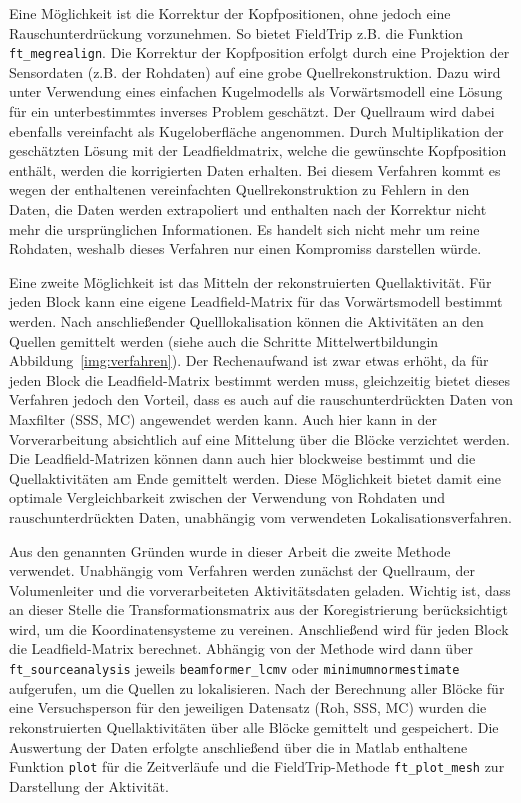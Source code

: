 \documentclass[doc,a4paper,12pt]{apa6}
\begin{document}
Eine Möglichkeit ist die Korrektur der Kopfpositionen, ohne jedoch eine Rauschunterdrückung vorzunehmen. So bietet FieldTrip z.B. die Funktion \texttt{ft\_megrealign}. Die Korrektur der Kopfposition erfolgt durch eine Projektion der Sensordaten (z.B. der Rohdaten) auf eine grobe Quellrekonstruktion. Dazu wird unter Verwendung eines einfachen Kugelmodells als Vorwärtsmodell eine Lösung für ein unterbestimmtes inverses Problem geschätzt. Der Quellraum wird dabei ebenfalls vereinfacht als Kugeloberfläche angenommen. Durch Multiplikation der geschätzten Lösung mit der Leadfieldmatrix, welche die gewünschte Kopfposition enthält, werden die korrigierten Daten erhalten. Bei diesem Verfahren kommt es wegen der enthaltenen vereinfachten Quellrekonstruktion zu Fehlern in den Daten, die Daten werden extrapoliert und enthalten nach der Korrektur nicht mehr die ursprünglichen Informationen. Es handelt sich nicht mehr um reine Rohdaten, weshalb dieses Verfahren nur einen Kompromiss darstellen würde.

Eine zweite Möglichkeit ist das Mitteln der rekonstruierten Quellaktivität. Für jeden Block kann eine eigene Leadfield-Matrix für das Vorwärtsmodell bestimmt werden. Nach anschließender Quelllokalisation können die Aktivitäten an den Quellen gemittelt werden (siehe auch die Schritte \glqq Mittelwertbildung\grqq in Abbildung~\ref{img:verfahren}). Der Rechenaufwand ist zwar etwas erhöht, da für jeden Block die Leadfield-Matrix bestimmt werden muss, gleichzeitig bietet dieses Verfahren jedoch den Vorteil, dass es auch auf die rauschunterdrückten Daten von Maxfilter (SSS, MC) angewendet werden kann. Auch hier kann in der Vorverarbeitung absichtlich auf eine Mittelung über die Blöcke verzichtet werden. Die Leadfield-Matrizen können dann auch hier blockweise bestimmt und die Quellaktivitäten am Ende gemittelt werden. Diese Möglichkeit bietet damit eine optimale Vergleichbarkeit zwischen der Verwendung von Rohdaten und rauschunterdrückten Daten, unabhängig vom verwendeten Lokalisationsverfahren.

Aus den genannten Gründen wurde in dieser Arbeit die zweite Methode verwendet. Unabhängig vom Verfahren werden zunächst der Quellraum, der Volumenleiter und die vorverarbeiteten Aktivitätsdaten geladen. Wichtig ist, dass an dieser Stelle die Transformationsmatrix aus der Koregistrierung berücksichtigt wird, um die Koordinatensysteme zu vereinen. Anschließend wird für jeden Block die Leadfield-Matrix berechnet. Abhängig von der Methode wird dann über \texttt{ft\_sourceanalysis} jeweils \texttt{beamformer\_lcmv} oder \texttt{minimumnormestimate} aufgerufen, um die Quellen zu lokalisieren. Nach der Berechnung aller Blöcke für eine Versuchsperson für den jeweiligen Datensatz (Roh, SSS, MC) wurden die rekonstruierten Quellaktivitäten über alle Blöcke gemittelt und gespeichert. Die Auswertung der Daten erfolgte anschließend über die in Matlab enthaltene Funktion \texttt{plot} für die Zeitverläufe und die FieldTrip-Methode \texttt{ft\_plot\_mesh} zur Darstellung der Aktivität.
\end{document}
